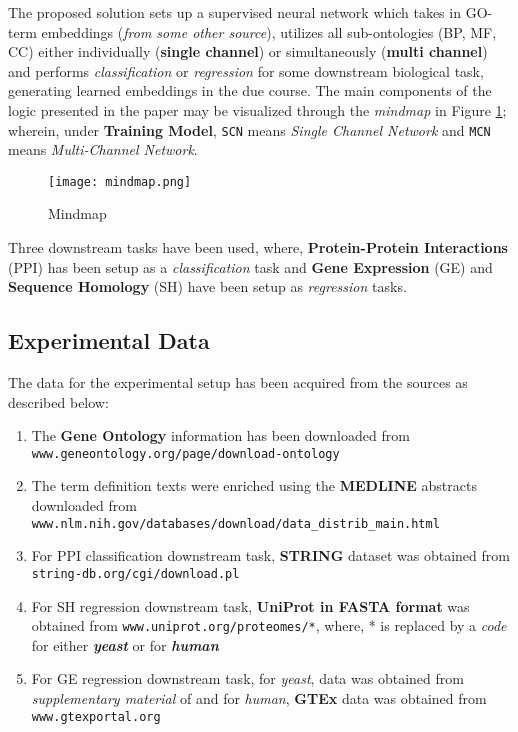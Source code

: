 \begin{sloppypar*}
    The proposed solution\cite{deepSimDEFOFCLimpl} sets up a supervised neural 
    network which takes in GO-term embeddings (\textit{from some other source}),
    utilizes all sub-ontologies (BP, MF, CC) either individually (\textbf{single
    channel}) or simultaneously (\textbf{multi channel}) and performs \textit{classification}
    or \textit{regression} for some downstream biological task, generating learned
    embeddings in the due course. The main components of the logic presented in 
    the paper may be visualized through the \textit{mindmap} in Figure \ref{fig:mindmap};
    wherein, under \textbf{Training Model}, \verb|SCN| means \textit{Single Channel Network}
    and \verb|MCN| means \textit{Multi-Channel Network}.\hfill\newline

    \begin{figure}
        \centering
        \texttt{[image: mindmap.png]}
        \caption{Mindmap}
        \label{fig:mindmap}
    \end{figure}

    Three downstream tasks have been used, where, \textbf{Protein-Protein Interactions}
    (PPI) has been setup as a \textit{classification} task and \textbf{Gene Expression}
    (GE) and \textbf{Sequence Homology} (SH) have been setup as \textit{regression} tasks.

    \subsection{Experimental Data}
        The data for the experimental setup has been acquired from the sources as described below:
        \begin{enumerate}
            \item The \textbf{Gene Ontology} information has been downloaded from 
            \verb|www.geneontology.org/page/download-ontology|
            \item The term definition texts were enriched using the \textbf{MEDLINE}
            abstracts downloaded from \verb|www.nlm.nih.gov/databases/download/data_distrib_main.html|
            \item For PPI classification downstream task, \textbf{STRING} dataset
            was obtained from \verb|string-db.org/cgi/download.pl|
            \item For SH regression downstream task, \textbf{UniProt in FASTA format}
            was obtained from \verb|www.uniprot.org/proteomes/*|, where, * is replaced by a 
            \textit{code} for either \textbf{\textit{yeast}} or for \textbf{\textit{human}}
            \item For GE regression downstream task, for \textit{yeast}, data was
            obtained from \textit{supplementary material} of \cite{geneexpryeast} and for
            \textit{human}, \textbf{GTEx} data was obtained from \verb|www.gtexportal.org|
        \end{enumerate}
    

\end{sloppypar*}
